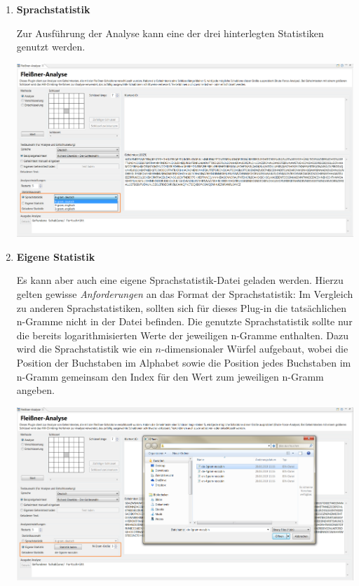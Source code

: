 \documentclass[fontsize=12pt, DIV=15, parskip=half-]{scrartcl}
\theoremstyle{break}
\begin{document}
\begin{enumerate}[label=(\alph*), leftmargin=*]
\item \textbf{Sprachstatistik}

Zur Ausführung der Analyse kann eine der drei hinterlegten Statistiken genutzt werden. 

\includegraphics[scale=0.4]{FleissnerStatisticsExample.png}

\item \textbf{Eigene Statistik}

Es kann aber auch eine eigene Sprachstatistik-Datei geladen werden. Hierzu gelten gewisse \textit{Anforderungen} an das Format der Sprachstatistik:
Im Vergleich zu anderen Sprachstatistiken, sollten sich für dieses Plug-in die tatsächlichen n-Gramme nicht in der Datei befinden. Die genutzte Sprachstatistik sollte nur die bereits logarithmisierten Werte der jeweiligen n-Gramme enthalten. Dazu wird die Sprachstatistik wie ein $n$-dimensionaler Würfel aufgebaut, wobei die Position der Buchstaben im Alphabet sowie die Position jedes Buchstaben im n-Gramm gemeinsam den Index für den Wert zum jeweiligen n-Gramm angeben.

\includegraphics[scale=0.4]{FleissnerOwnStatistics.png}


\end{enumerate}
\end{document}
